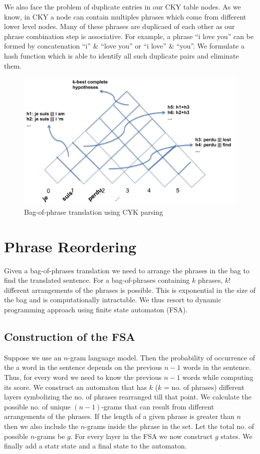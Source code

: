 \documentclass[11pt]{article}
\numberwithin{equation}{section}
\begin{document}
We also face the problem of duplicate entries in our CKY table nodes. As we know, in CKY a node can contain multiples phrases which 
come from different lower level nodes. Many of these phrases are duplicaed of each other as our phrase combination step is associative.
For example, a phrase ``i love you'' can be formed by concatenation ``i'' \& ``love you'' or ``i love'' \& ``you''. We formulate a hash
function which is able to identify all such duplicate pairs and eliminate them.



\begin{figure}[tb]
  \centering
  \includegraphics[width=1.5\columnwidth]{cky.png}
  \caption{Bag-of-phrase translation using CYK parsing}
  \label{fig:cky}
\end{figure}

\section{Phrase Reordering}
\label{sec:reordering}

Given a bag-of-phrases translation we need to arrange the phrases in the bag to find the translated
sentence. For a bag-of-phrases containing $k$ phrases, $k!$ different arrangements of the phrases is
possible. This is exponential in the size of the bag and is computationally intractable. We thus
resort to dynamic programming approach using finite state automaton (FSA).

\subsection{Construction of the FSA} 
Suppose we use an $n$-gram language model. Then the probability
of occurrence of the a word in the sentence depends on the previous $n-1$ words in the sentence. Thus,
for every word we need to know the previous $n-1$ words while computing its score. We construct an
automaton that has $k$ ($k$ = no. of phrases) different layers symbolizing the no. of phrases rearranged
till that point. We calculate the possible no. of unique $(n-1)$-grams that can result from different arrangements
of the phrases. If the length of a given phrase is greater than $n$ then we also include the $n$-grams inside
the phrase in the set. Let the total no. of possible $n$-grams be $g$. For every layer in the FSA we now construct
$g$ states. We finally add a statr state and a final state to the automaton.
\end{document}
